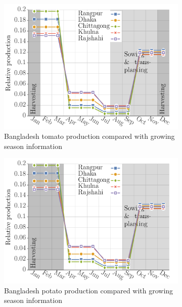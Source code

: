 \documentclass[10pt]{article}
\theoremstyle{definition}
\begin{document}
\begin{figure}[!ht]
\centering
\begin{subfigure}[b]{.32\textwidth}
\includegraphics[width=\textwidth]{../production/results/prod_tomato_BGD.pdf}
\caption{Bangladesh tomato production compared with growing season
    information~\cite{bbs2017}}
\end{subfigure}
\begin{subfigure}[b]{.32\textwidth}
\includegraphics[width=\textwidth]{../production/results/prod_potato_BGD.pdf}
\caption{Bangladesh potato production compared with growing season
    information~\cite{bbs2017}}
\end{subfigure}
\begin{subfigure}[b]{.32\textwidth}

\end{subfigure}
\end{figure}
\end{document}
